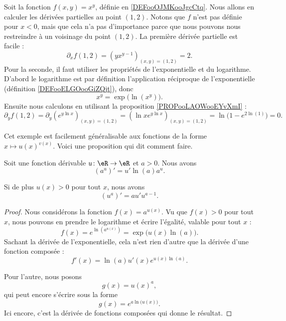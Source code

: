 \begin{example}     \label{EXooGMRIooUucRez}
    Soit la fonction \( f(x,y)=x^y\), définie en \ref{DEFooOJMKooJgcCtq}. Nous allons en calculer les dérivées partielles au point \( (1,2)\). Notons que \( f\) n'est pas définie pour \( x<0\), mais que cela n'a pas d'importance parce que nous pouvons nous restreindre à un voisinage du point \( (1,2)\). La première dérivée partielle est facile :
    \[
        \partial_x f(1,2)=(yx^{y-1})_{(x,y)=(1,2)}=2.
    \]
    Pour la seconde, il faut utiliser les propriétés de l'exponentielle et du logarithme. D'abord le logarithme est par définition l'application réciproque de l'exponentielle (définition \ref{DEFooELGOooGiZQjt}), donc 
    \begin{equation}
        x^y=\exp\big( \ln(x^y) \big).
    \end{equation}
    Ensuite nous calculons en utilisant la proposition \ref{PROPooLAOWooEYvXmI} :
    \[
        \partial_y f(1,2)=\partial_y\left(e^{y\ln x}\right)_{(x,y)=(1,2)}=\left(\ln x e^{y\ln x}\right)_{(x,y)=(1,2)}=\ln\big( 1- e^{2\ln(1)} \big)=0.
    \]
\end{example}


Cet exemple est facilement généralisable aux fonctions de la forme \( x\mapsto u(x)^{v(x)}\). Voici une proposition qui dit comment faire.
\begin{proposition}     \label{PROPooKUULooKSEULJ}
    Soit une fonction dérivable \( u\colon \eR\to \eR\) et \( a>0\). Nous avons
    \begin{equation}
        \left( a^u\right)'=u'\ln(a)a^u.
    \end{equation}

    Si de plus \( u(x)>0\) pour tout \( x\), nous avons
    \begin{equation}
        \left( u^a \right)'=au'u^{a-1}.
    \end{equation}
\end{proposition}

\begin{proof}
    Nous considérons la fonction \( f(x)= a^{u(x)}\). Vu que \( f(x)>0\) pour tout \( x\), nous pouvons en prendre le logarithme et écrire l'égalité, valable pour tout \( x\) :
    \begin{equation}
        f(x)= e^{\ln(a^{u(x)})}=\exp\big( u(x)\ln(a) \big).
    \end{equation}
    Sachant la dérivée de l'exponentielle, cela n'est rien d'autre que la dérivée d'une fonction composée :
    \begin{equation}
        f'(x)=\ln(a) u'(x) e^{u(x)\ln(a)}.
    \end{equation}
    
    Pour l'autre, nous posons 
    \begin{equation}
        g(x)=u(x)^a,
    \end{equation}
    qui peut encore s'écrire sous la forme
    \begin{equation}
        g(x)= e^{a\ln\big( u(x) \big)}.
    \end{equation}
    Ici encore, c'est la dérivée de fonctions composées qui donne le résultat.
\end{proof}

